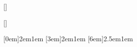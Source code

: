 \usepackage[utf8]{inputenc}
\usepackage{subfiles}
\usepackage[left=0.85in,right=0.85in,top=0.89in,bottom=1.15in]{geometry}
\usepackage{amsmath,amssymb,amsthm}
\usepackage{mathrsfs}
\usepackage{enumitem}
\usepackage{tikz-cd}
\usepackage{epigraph}
\usepackage[super]{nth}
\usepackage{titlesec,titletoc}
\usepackage{soul}
\usepackage[draft]{hyperref}


\renewcommand{\rmdefault}{pplx}
\usepackage{eulervm}

\allowdisplaybreaks[1]



[\setcounter{section}{0}]
[\setcounter{subsection}{0}]



[0em]{\sc}{2em}{1em}
[3em]{\bfseries}{2em}{1em}
[6em]{}{2.5em}{1em}

\renewcommand{\contentsname}{\centering Contents}

